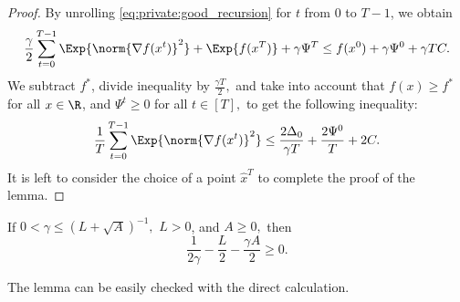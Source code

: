 \documentclass{article}
\begin{document}
\begin{proof}
  By unrolling \eqref{eq:private:good_recursion} for $t$ from $0$ to $T - 1$, we obtain
  \begin{align*}
      \frac{\gamma}{2}\sum_{t = 0}^{T - 1}\Exp{\norm{\nabla f(x^t)}^2} + \Exp{f(x^{T})} + \gamma \Psi^{T} \leq f(x^0) + \gamma \Psi^{0} + \gamma T C.
  \end{align*}
  We subtract $f^*$, divide inequality by $\frac{\gamma T}{2},$ and take into account that $f(x) \geq f^*$ for all $x \in \R$, and $\Psi^{t} \geq 0$ for all $t \in [T],$ to get the following inequality:
  \begin{align*}
      \frac{1}{T}\sum_{t = 0}^{T - 1}\Exp{\norm{\nabla f(x^t)}^2} \leq \frac{2 \Delta_0}{\gamma T} + \frac{2\Psi^{0}}{T} + 2 C.
  \end{align*}
  It is left to consider the choice of a point $\widehat{x}^T$ to complete the proof of the lemma.
\end{proof}

\begin{lemma}
  \label{lemma:gamma}
  If $0 < \gamma \leq (L + \sqrt{A})^{-1},$ $L > 0$, and $A \geq 0,$ then $$\frac{1}{2\gamma} - \frac{L}{2} - \frac{\gamma A}{2} \geq 0.$$
\end{lemma}
The lemma can be easily checked with the direct calculation.
\end{document}
